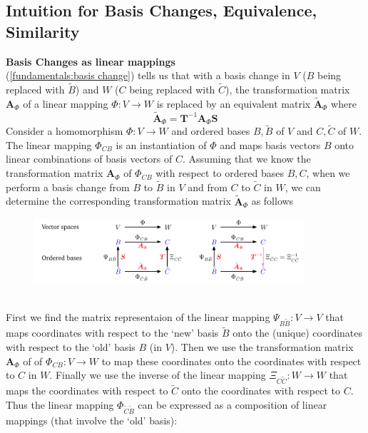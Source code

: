 \documentclass{report}
\begin{document}
\subsection{Intuition for Basis Changes, Equivalence, \\Similarity} %
\label{fundamentals:equivalence and similarity}
\textbf{Basis Changes as linear mappings}\\
(\ref{fundamentals:basis change}) tells us that with a basis change in $V$ ($B$ being replaced with $\tilde{B}$)
and $W$ ($C$ being replaced with $\tilde{C}$), the transformation matrix $\bm{A}_\Phi$ of a linear
mapping $\Phi:V\to W$ is replaced by an equivalent matrix $\tilde{\bm{A}}_\Phi$ where
\begin{equation*}
\tilde{\bm{A}}_\Phi=\bm{T}^{-1}\bm{A}_\Phi\bm{S}
\end{equation*}
Consider a homomorphism $\Phi:V\to W$ and ordered bases $B,\tilde{B}$ of $V$ and $C,\tilde{C}$ of $W$.
The linear mapping $\Phi_{CB}$ is an instantiation of $\Phi$ and maps basis vectors $B$
onto linear combinations of basis vectors of $C$. Assuming that we know the transformation matrix $\bm{A}_\Phi$
of $\Phi_{CB}$ with respect to ordered bases $B,C$, when we perform a basis change from $B$ to 
$\tilde{B}$ in $V$ and from $C$ to $\tilde{C}$ in $W$, we can determine the corresponding transformation matrix 
$\tilde{\bm{A}}_\Phi$ as follows
\begin{figure}[h]
\includegraphics[width=10cm]{2}\\
\centering
\end{figure}\\
First we find the matrix representaion of the linear mapping $\Psi_{B\tilde{B}}:V\to V$ that 
maps coordinates with respect to the `new' basis $\tilde{B}$ onto the (unique) coordinates with respect 
to the `old' basis $B$ (in $V$). Then we use the transformation matrix $\bm{A}_\Phi$ of 
of $\Phi_{CB}:V\to W$ to map these coordinates onto the coordinates with respect to $C$ in $W$. 
Finally we use the inverse of the linear mapping $\Xi_{C\tilde{C}}:W\to W$ that maps the coordinates 
with respect to $\tilde{C}$ onto the coordinates with respect to $C$. Thus the linear mapping 
$\Phi_{\tilde{C}\tilde{B}}$ can be expressed as a composition of linear mappings (that involve the `old' basis):
\end{document}
